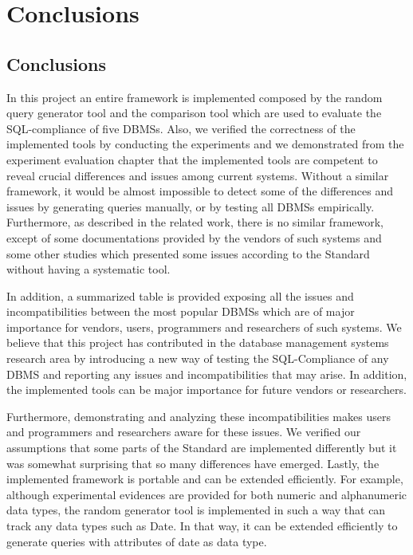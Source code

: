 \chapter{Conclusions}

\section{Conclusions}

In this project an entire framework is implemented composed by the random query generator tool and the comparison tool which are used to evaluate the SQL-compliance of five DBMSs. Also, we verified the correctness of the implemented tools by conducting the experiments and we demonstrated from the experiment evaluation chapter that the implemented tools are competent to reveal crucial differences and issues among current systems. Without a similar framework, it would be almost impossible to detect some of the differences and issues  by generating queries manually, or by testing all DBMSs empirically. Furthermore, as described in the related work, there is no similar framework, except of some documentations provided by the vendors of such systems and some other studies which presented some issues according to the Standard without having a systematic tool. 

In addition, a summarized table is provided exposing all the issues and incompatibilities between the most popular DBMSs which are of major importance for vendors, users, programmers and researchers of such systems. We believe that this project has contributed in the database management systems research area by introducing a new way of testing the SQL-Compliance of any DBMS and reporting any issues and incompatibilities that may arise. In addition, the implemented tools can be major importance for future vendors or researchers.

Furthermore, demonstrating and analyzing these incompatibilities makes users and programmers and researchers aware for these issues. We verified our assumptions that some parts of the Standard are implemented differently but it was somewhat surprising that so many differences have emerged. Lastly, the implemented framework is portable and can be extended efficiently. For example, although experimental evidences are provided for both numeric and alphanumeric data types, the random generator tool is implemented in such a way that can track any data types such as Date. In that way, it can be extended efficiently to generate queries with attributes of date as data type. 

